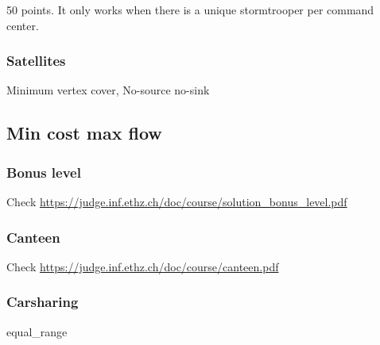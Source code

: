 \documentclass[10pt,a4paper,landscape,twocolumn,twoside]{article}
\begin{document}
		50 points. It only works when there is a unique stormtrooper per command center.
		

		\subsubsection{Satellites}
		\label{subs:Satellites}
		\begin{keywords}Minimum vertex cover, No-source no-sink\end{keywords}
		

	\newpage
	\subsection{Min cost max flow}
	\label{sub:Min cost max flow}

		\subsubsection{Bonus level}
		\label{subs:Bonus level}
		\begin{keywords}\end{keywords}

		Check \url{https://judge.inf.ethz.ch/doc/course/solution_bonus_level.pdf}
		

		\subsubsection{Canteen}
		\label{subs:Canteen}
		\begin{keywords}\end{keywords}

		Check \url{https://judge.inf.ethz.ch/doc/course/canteen.pdf}
		

		\subsubsection{Carsharing}
		\label{subs:Carsharing}
		\begin{keywords}equal\_range\end{keywords}
\end{document}
